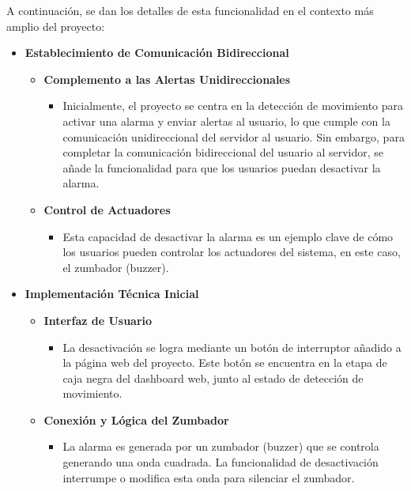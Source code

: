 \documentclass{report}
\begin{document}
A continuación, se dan los detalles de esta funcionalidad en el contexto más amplio del proyecto:
\begin{itemize}
    
    \item \textbf{Establecimiento de Comunicación Bidireccional}
    \begin{itemize}
        \item \textbf{Complemento a las Alertas Unidireccionales}
        \begin{itemize}
            \item Inicialmente, el proyecto se centra en la detección de movimiento para activar una alarma y enviar alertas al usuario, 
            lo que cumple con la comunicación unidireccional del servidor al usuario. Sin embargo, para completar la comunicación bidireccional del usuario al 
            servidor, se añade la funcionalidad para que los usuarios puedan desactivar la alarma.
        \end{itemize}
        \item \textbf{Control de Actuadores}
        \begin{itemize}
            \item Esta capacidad de desactivar la alarma es un ejemplo clave de cómo los usuarios pueden controlar los actuadores del sistema, en este 
            caso, el zumbador (buzzer).
        \end{itemize}
    \end{itemize}

    \item \textbf{Implementación Técnica Inicial}
    \begin{itemize}
        \item \textbf{Interfaz de Usuario}
        \begin{itemize}
            \item La desactivación se logra mediante un botón de interruptor añadido a la página web del proyecto. Este botón se encuentra en la etapa 
            de caja negra del dashboard web, junto al estado de detección de movimiento.
        \end{itemize}

        \item \textbf{Conexión y Lógica del Zumbador}
        \begin{itemize}
            \item La alarma es generada por un zumbador (buzzer) que se controla generando una onda cuadrada. La funcionalidad de desactivación interrumpe 
            o modifica esta onda para silenciar el zumbador.
        \end{itemize}


\end{itemize}
\end{itemize}
\end{document}
